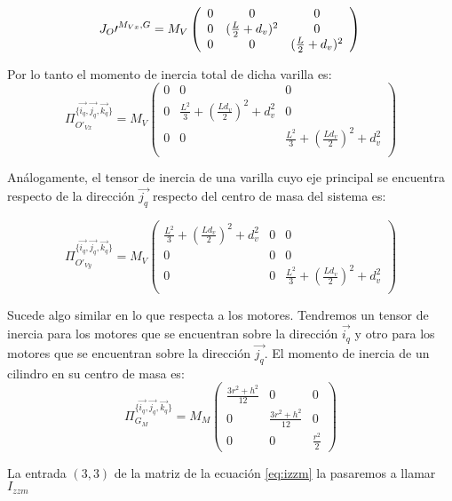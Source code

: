 \documentclass[main]{subfiles}
\begin{document}
$$
J_O\prime^{M_{Vx},G}= M_V \left(\begin{array}{ccc}
0  &0&  0\\
0  & (\frac{L}{2}+d_v)^2 & 0\\
0  &0 & (\frac{L}{2}+d_v)^2  \\
\end{array}\right) \\
$$

Por lo tanto el momento de inercia total de dicha varilla es:
$$
\Pi_{O\prime_{Vx}}^{\{\vec{i_q}, \vec{j_q}, \vec{k_q}\}}=M_V \left(\begin{array}{ccc}
0  &0&  0\\
0  &\frac{L^2}{3}+(\frac{Ld_v}{2})^2+d_v^2 & 0\\
0  &0 & \frac{L^2}{3}+(\frac{Ld_v}{2})^2+d_v^2  \\
\end{array}\right)$$


Análogamente, el tensor de inercia de una varilla cuyo eje principal se encuentra respecto de la dirección $\vec{j_q}$ respecto del centro de masa del sistema es:

$$
\Pi_{O\prime_{Vy}}^{\{\vec{i_q}, \vec{j_q}, \vec{k_q}\}}=M_V \left(\begin{array}{ccc}
\frac{L^2}{3}+(\frac{Ld_v}{2})^2+d_v^2  &0 & 0\\
0  &0 & 0\\
0  &0 & \frac{L^2}{3}+(\frac{Ld_v}{2})^2+d_v^2  \\
\end{array}\right)$$


Sucede algo similar en lo que respecta a los motores. Tendremos un tensor de inercia para los motores que se encuentran sobre la dirección $\vec{i_q}$ y otro para los motores que se encuentran sobre la dirección $\vec{j_q}$. El momento de inercia de un cilindro en su centro de masa es:\\
\begin{equation}
\label{eq:izzm}
\Pi_{G_{M}}^{\{\vec{i_q}, \vec{j_q}, \vec{k_q}\}}=M_M\left(\begin{array}{ccc}
\frac{3r^2+h^2}{12}  &0&  0\\
0  &\frac{3r^2+h^2}{12} & 0\\
0  &0 & \frac{r^2}{2}  
\end{array}\right)
\end{equation}

La entrada $(3,3)$ de la matriz de la ecuación \ref{eq:izzm} la pasaremos a llamar $I_{zzm}$\\
\end{document}
